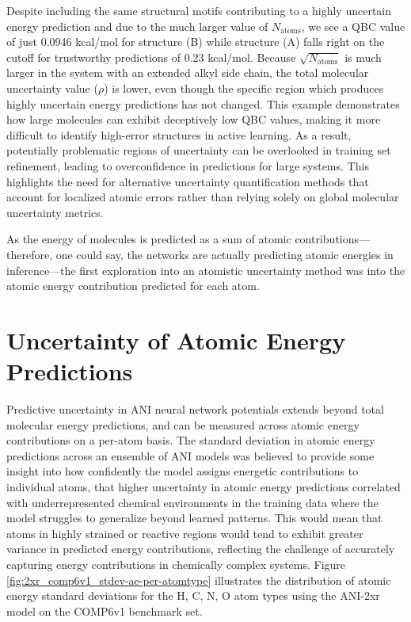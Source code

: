 Despite including the same structural motifs contributing to a highly uncertain energy prediction and due to the much larger value of $N_{\text{atoms}}$, we see a QBC value of just 0.0946 kcal/mol for structure (B) while structure (A) falls right on the cutoff for trustworthy predictions of 0.23 kcal/mol.
Because $\sqrt{N_\text{atoms}}$ is much larger in the system with an extended alkyl side chain, the total molecular uncertainty value ($\rho$) is lower, even though the specific region which produces highly uncertain energy predictions has not changed.
This example demonstrates how large molecules can exhibit deceptively low QBC values, making it more difficult to identify high-error structures in active learning. 
As a result, potentially problematic regions of uncertainty can be overlooked in training set refinement, leading to overconfidence in predictions for large systems. 
This highlights the need for alternative uncertainty quantification methods that account for localized atomic errors rather than relying solely on global molecular uncertainty metrics.

As the energy of molecules is predicted as a sum of atomic contributions---therefore, one could say, the networks are actually predicting atomic energies in inference---the first exploration into an atomistic uncertainty method was into the atomic energy contribution predicted for each atom.

\section{Uncertainty of Atomic Energy Predictions}
\label{sec:uncertainty_atomic_energies}

Predictive uncertainty in ANI neural network potentials extends beyond total molecular energy predictions, and can be measured across atomic energy contributions on a per-atom basis. 
The standard deviation in atomic energy predictions across an ensemble of ANI models was believed to provide some insight into how confidently the model assigns energetic contributions to individual atoms, that higher uncertainty in atomic energy predictions correlated with underrepresented chemical environments in the training data where the model struggles to generalize beyond learned patterns. 
This would mean that atoms in highly strained or reactive regions would tend to exhibit greater variance in predicted energy contributions, reflecting the challenge of accurately capturing energy contributions in chemically complex systems.
Figure \ref{fig:2xr_comp6v1_stdev-ae-per-atomtype} illustrates the distribution of atomic energy standard deviations for the H, C, N, O atom types using the ANI-2xr model on the COMP6v1 benchmark set.

